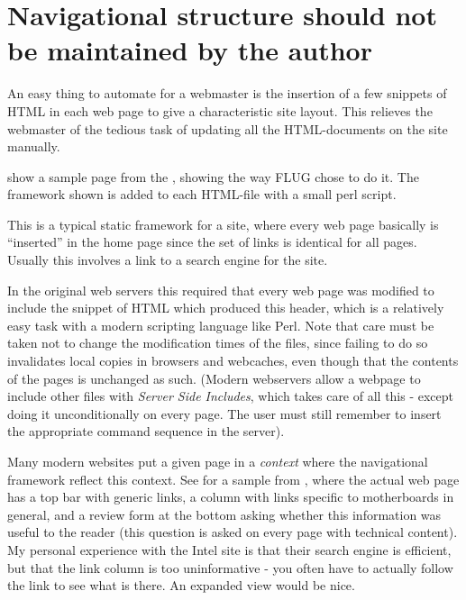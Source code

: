 \section{Navigational structure should not be maintained by the author}


An easy thing to automate for a webmaster is the insertion of a few
snippets of HTML in each web page to give a characteristic site
layout.  This relieves the webmaster of the tedious task of updating
all the HTML-documents on the site manually.

 show a sample page from the
,
showing the way FLUG chose to do it.  The framework shown is added to
each HTML-file with a small perl script.

This is a typical static framework for a site, where every web page
basically is ``inserted'' in the home page since the set of links is
identical for all pages.  Usually this involves a link to a search
engine for the site.

In the original web servers this required that every web page was
modified to include the snippet of HTML which produced this header,
which is a relatively easy task with a modern scripting language like
Perl.  Note that care must be taken not to change the modification
times of the files, since failing to do so invalidates local copies in
browsers and webcaches, even though that the contents of the pages is
unchanged as such.  (Modern webservers allow a webpage to include
other files with
%
{\textit{Server Side Includes}}, which takes care of all this - except
doing it unconditionally on every page.  The user must still remember
to insert the appropriate command sequence in the server).

%
%
Many modern websites put a given page in a \textit{context} where the
navigational framework reflect this context.  See
 for a sample from
, where the actual web page has a
top bar with generic links, a column with links specific to
motherboards in general, and a review form at the bottom asking
whether this information was useful to the reader (this question is
asked on every page with technical content).  My personal experience
with the Intel site is that their search engine is efficient, but that
the link column is too uninformative - you often have to actually
follow the link to see what is there.  An expanded view would be nice.

